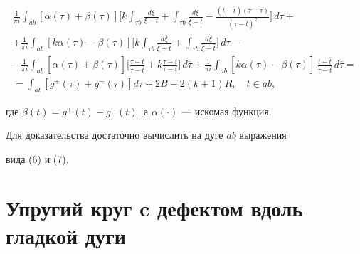 \begin{thm}
\begin{multline*}
\frac{1}{\pi i}\int_{ab} [\alpha(\tau)+\beta(\tau)]


\bigg[k\int_{\tau b}\frac{d\xi}{\xi-t}


+ \int_{\tau b}\frac{d\xi}{\xi-\overline{t}}


- \frac{(t-\overline{t})(\overline{\tau}-\tau)}{(\tau-\overline{t})^2}


\bigg]\,d\tau + \\


%


+ \frac{1}{\pi i}\int_{ab} [k\alpha(\tau)-\beta(\tau)]


\bigg[k\int_{\tau b}\frac{d\overline{\xi}}{\overline{\xi}-t}


+ \int_{\tau b}\frac{d\overline{\xi}}{\overline{\xi}-\overline{t}}


\bigg]\,d\tau - \\


%


- \frac{1}{\pi i}\int_{ab} [\overline{\alpha(\tau)}


+\overline{\beta(\tau)}]


\bigg[\frac{\tau-t}{\overline{\tau}-\overline{t}}


+ k \frac{\tau-t}{\overline{\tau}-t}


\bigg]\,d\overline{\tau}


+ \frac{1}{\pi i}\int_{ab} [k\overline{\alpha(\tau)}


-\overline{\beta(\tau)}]


\,\frac{t-\overline{t}}{\tau-\overline{t}}\,d\overline{\tau} = \\


%


= \int_{at} [g^+(\tau)+g^-(\tau)]d\tau + 2B - 2(k+1)R,\quad t\in ab ,


\end{multline*}


где $\beta(t)=g^+(t)-g^-(t)$, а $\alpha(\cdot)$ --- искомая функция.


\end{thm}





Для доказательства достаточно вычислить на дуге $ab$ выражения


вида (6) и (7).





\section{Упругий круг c дефектом вдоль гладкой дуги}





